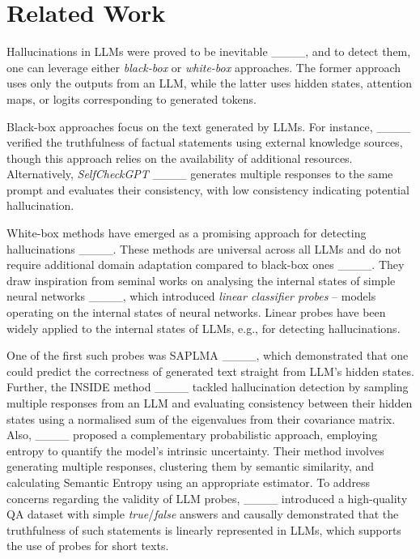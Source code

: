 \section{Related Work}
Hallucinations in LLMs were proved to be inevitable ____, and to detect them, one can leverage either \textit{black-box} or \textit{white-box} approaches. The former approach uses only the outputs from an LLM, while the latter uses hidden states, attention maps, or logits corresponding to generated tokens.

Black-box approaches focus on the text generated by LLMs. For instance, ____ verified the truthfulness of factual statements using external knowledge sources, though this approach relies on the availability of additional resources. Alternatively, \textit{SelfCheckGPT} ____ generates multiple responses to the same prompt and evaluates their consistency, with low consistency indicating potential hallucination.

White-box methods have emerged as a promising approach for detecting hallucinations ____. These methods are universal across all LLMs and do not require additional domain adaptation compared to black-box ones ____. They draw inspiration from seminal works on analysing the internal states of simple neural networks ____, which introduced \textit{linear classifier probes} -- models operating on the internal states of neural networks. Linear probes have been widely applied to the internal states of LLMs, e.g., for detecting hallucinations. 

One of the first such probes was SAPLMA ____, which demonstrated that one could predict the correctness of generated text straight from LLM's hidden states. Further, the INSIDE method ____ tackled hallucination detection by sampling multiple responses from an LLM and evaluating consistency between their hidden states using a normalised sum of the eigenvalues from their covariance matrix. Also, ____ proposed a complementary probabilistic approach, employing entropy to quantify the model's intrinsic uncertainty. Their method involves generating multiple responses, clustering them by semantic similarity, and calculating Semantic Entropy using an appropriate estimator. To address concerns regarding the validity of LLM probes, ____ introduced a high-quality QA dataset with simple \textit{true}/\textit{false} answers and causally demonstrated that the truthfulness of such statements is linearly represented in LLMs, which supports the use of probes for short texts.

